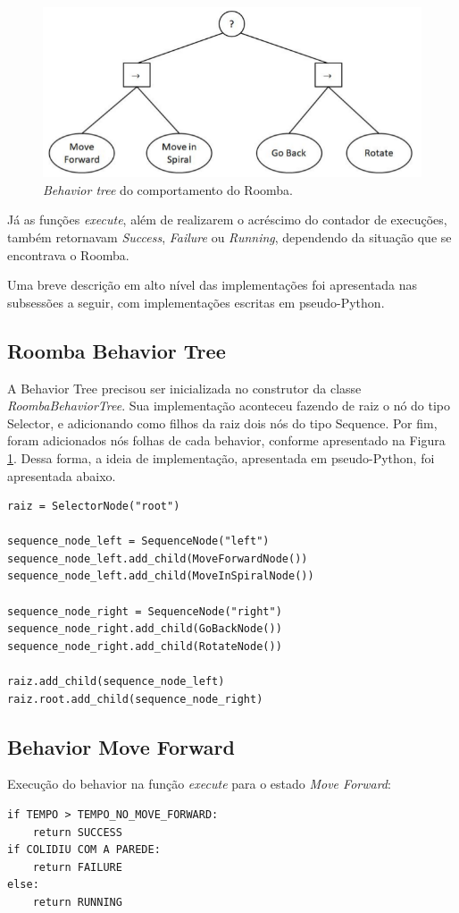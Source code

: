 \documentclass[conference]{IEEEtran}
\begin{document}
\begin{figure}[htbp]
\centerline{\includegraphics[scale=0.4]{behavior_tree.png}}
\caption{\textit{Behavior tree} do comportamento do Roomba.}
\label{behavior_tree}
\end{figure}

Já as funções \textit{execute}, além de realizarem o acréscimo do contador de execuções, também retornavam \textit{Success}, \textit{Failure} ou \textit{Running}, dependendo da situação que se encontrava o Roomba.

Uma breve descrição em alto nível das implementações foi apresentada nas subsessões a seguir, com implementações escritas em pseudo-Python.

\subsection{Roomba Behavior Tree}
A Behavior Tree precisou ser inicializada no construtor da classe \textit{RoombaBehaviorTree}. Sua implementação aconteceu fazendo de raiz o nó do tipo Selector, e adicionando como filhos da raiz dois nós do tipo Sequence. Por fim, foram adicionados nós folhas de cada behavior, conforme apresentado na Figura \ref{behavior_tree}. Dessa forma, a ideia de implementação, apresentada em pseudo-Python, foi apresentada abaixo.
\begin{lstlisting}
raiz = SelectorNode("root")

sequence_node_left = SequenceNode("left")
sequence_node_left.add_child(MoveForwardNode())
sequence_node_left.add_child(MoveInSpiralNode())

sequence_node_right = SequenceNode("right")
sequence_node_right.add_child(GoBackNode())
sequence_node_right.add_child(RotateNode())

raiz.add_child(sequence_node_left)
raiz.root.add_child(sequence_node_right)
\end{lstlisting}

\subsection{Behavior Move Forward}
Execução do behavior na função \textit{execute} para o estado \textit{Move Forward}:
\begin{lstlisting}
if TEMPO > TEMPO_NO_MOVE_FORWARD:
	return SUCCESS
if COLIDIU COM A PAREDE:
	return FAILURE
else:
	return RUNNING
\end{lstlisting}
\end{document}
